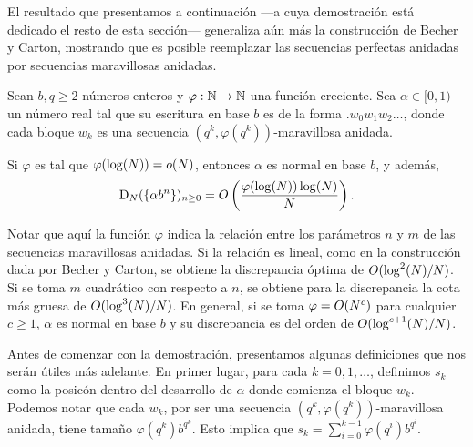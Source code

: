 El resultado que presentamos a continuación ---a cuya demostración está dedicado
el resto de esta sección--- generaliza aún más la construcción de Becher y
Carton, mostrando que es posible reemplazar las secuencias perfectas anidadas
por secuencias maravillosas anidadas.

\begin{theorem}
\label{theorem:discrepancy-bound}
Sean $b, q \geq 2$ números enteros y
$\varphi: \mathbb{N} \to \mathbb{N}$ una función creciente.
Sea $\alpha \in [0, 1)$ un número real tal que su escritura en base $b$
es de la forma $.w_0w_1w_2\dots$, donde cada bloque $w_k$ es una secuencia
$(q^k, \varphi(q^k))$-maravillosa anidada.

Si $\varphi$ es tal que $\varphi(\log(N)) = o(N)$,
entonces $\alpha$ es normal en base $b$, y además,
\[ \operatorname{D}_{N}(\lbrace \alpha b^n \rbrace)_{n\geq0}
	= O\left( \frac{\varphi(\log(N))\log(N)}{N} \right). \]
\end{theorem}

Notar que aquí la función $\varphi$ indica la relación entre los parámetros $n$
y $m$ de las secuencias maravillosas anidadas. Si la relación es lineal, como
en la construcción dada por Becher y Carton, se obtiene la discrepancia óptima
de $O(\log^2(N)/N)$. Si se toma $m$ cuadrático con respecto a $n$, se
obtiene para la discrepancia la cota más gruesa de $O(\log^3(N)/N)$.
En general, si se toma $\varphi = O(N^c)$ para cualquier $c \geq 1$,
$\alpha$ es normal en base $b$ y su discrepancia es del orden de
$O(\log^{c + 1}(N)/N)$.



\medskip

Antes de comenzar con la demostración, presentamos algunas definiciones que
nos serán útiles más adelante.
En primer lugar, para cada $k = 0, 1, \dots$, definimos $s_k$ como la posicón
dentro del desarrollo de $\alpha$ donde comienza el bloque $w_k$.
Podemos notar que cada $w_k$, por ser una secuencia
$(q^k, \varphi(q^k))$-maravillosa anidada, tiene tamaño $\varphi(q^k)b^{q^k}$.
Esto implica que $s_k = \sum_{i=0}^{k-1} \varphi(q^i) b^{q^i}$.

